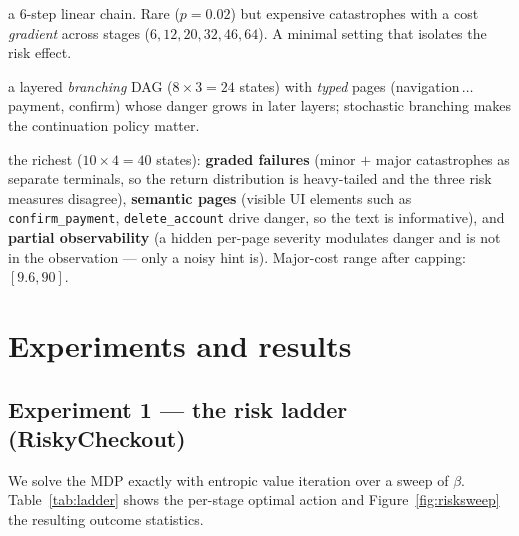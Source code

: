 \documentclass[11pt]{article}
\begin{document}
\begin{description}[leftmargin=1.2em]
\item[RiskyCheckout] a $6$-step linear chain. Rare ($p{=}0.02$) but expensive
  catastrophes with a cost \emph{gradient} across stages ($6,12,20,32,46,64$). A
  minimal setting that isolates the risk effect.
\item[RiskyWeb] a layered \emph{branching} DAG ($8\times3=24$ states) with
  \emph{typed} pages (navigation\,$\ldots$\,payment, confirm) whose danger grows in
  later layers; stochastic branching makes the continuation policy matter.
\item[RiskyFlow] the richest ($10\times4=40$ states): \textbf{graded failures}
  (minor $+$ major catastrophes as separate terminals, so the return distribution
  is heavy-tailed and the three risk measures disagree), \textbf{semantic pages}
  (visible UI elements such as \texttt{confirm\_payment}, \texttt{delete\_account}
  drive danger, so the text is informative), and \textbf{partial observability} (a
  hidden per-page severity modulates danger and is not in the observation --- only
  a noisy hint is). Major-cost range after capping: $[9.6, 90]$.
\end{description}

\section{Experiments and results}

\subsection{Experiment 1 --- the risk ladder (RiskyCheckout)}
We solve the MDP exactly with entropic value iteration over a sweep of $\beta$.
Table~\ref{tab:ladder} shows the per-stage optimal action and
Figure~\ref{fig:risksweep} the resulting outcome statistics.
\end{document}
